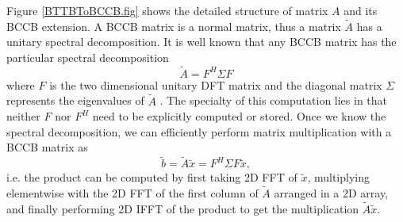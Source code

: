 \documentclass{UCF_ETD}
\begin{document}
 Figure \ref{BTTBToBCCB.fig} shows the detailed structure of matrix $A$ and its BCCB extension. A BCCB matrix is a normal matrix, thus a matrix $\tilde{A}$ has a unitary spectral decomposition. It is well known that any BCCB matrix has the particular spectral decomposition
 $$\tilde{A} = F^H\Sigma F$$
 where $F$ is the two dimensional unitary DFT matrix and the diagonal matrix $\Sigma$ represents the eigenvalues of $\tilde{A}$ \cite{Hansen2006}. The specialty of this computation lies in that neither $F$ nor $F^H$ need to be explicitly computed or stored. Once we know the spectral decomposition, we can efficiently perform matrix multiplication with a BCCB matrix as
 $$\tilde{b} = \tilde{A}\tilde{x} = F^H\Sigma F \tilde{x},$$
 i.e. the product can be computed by first taking 2D FFT of $\tilde{x}$, multiplying elementwise with the 2D FFT of the first column of $\tilde{A}$ arranged in a 2D array, and finally performing 2D IFFT of the product to get the multiplication $\tilde{A}\tilde{x}$.
 
\end{document}
